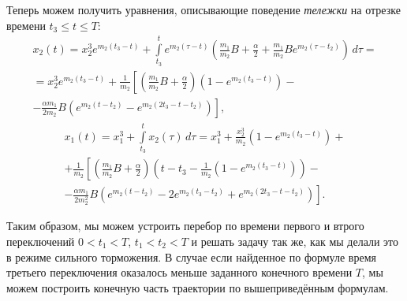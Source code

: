 Теперь можем получить уравнения, описывающие поведение \textit{тележки} на отрезке времени $t_3 \leqslant t \leqslant T$:
\begin{multline}
        x_2(t) = x_2^3 e^{m_2(t_3 - t)} + \int \limits_{t_3}^t e^{m_2(\tau - t)} \left(\frac{m_1}{m_2}B + \frac{\alpha}{2} + \frac{m_1}{m_2}Be^{m_2(\tau - t_2)}\right)\,d\tau = 
        \\
        =  x_2^3 e^{m_2(t_3 - t)} + \frac 1 {m_2} \left[
        \left( \frac{m_1}{m_2}B + \frac\alpha 2\right) \left( 1 - e^{m_2(t_3 - t)} \right) - \right.
        \\
        \left.
        - \frac{\alpha m_1}{2m_2}B\left( e^{m_2(t-t_2)} - e^{m_2(2t_3-t-t_2)}\right)\right],
\end{multline}
\begin{multline}
        x_1(t) = x_1^3 + \int\limits_{t_3}^t x_2(\tau)\,d\tau = x_1^3 + \frac{x_2^3}{m_2} \left(1 - e^{m_2(t_3 - t)}\right) +
        \\
        + \frac{1}{m_2} \left[ \left( \frac{m_1}{m_2}B + \frac \alpha 2 \right)\left( t - t_3 - \frac{1}{m_2} \left( 1 - e^{m_2(t_3 - t)}\right)\right) - \right.
        \\ 
        \left.
        - \frac{\alpha m_1}{2m_2^2}B\left( e^{m_2(t-t_2)} - 2e^{m_2(t_3-t_2)} + e^{m_2(2t_3-t-t_2)}\right)\right].
\end{multline}

Таким образом, мы можем устроить перебор по времени первого и втрого переключений $0 < t_1 < T$, $t_1 < t_2 < T$ и решать задачу так же, как мы делали это в режиме сильного торможения. В случае если найденное по формуле время третьего переключения оказалось меньше заданного конечного времени $T$, мы можем построить конечную часть траектории по вышеприведённым формулам.





